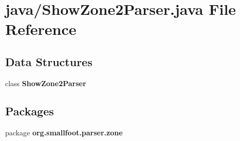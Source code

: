 \section{java/\+Show\+Zone2\+Parser.java File Reference}
\label{ShowZone2Parser_8java}
\subsection*{Data Structures}
\begin{DoxyCompactItemize}
\item 
class {\bf Show\+Zone2\+Parser}
\end{DoxyCompactItemize}
\subsection*{Packages}
\begin{DoxyCompactItemize}
\item 
package {\bf org.\+smallfoot.\+parser.\+zone}
\end{DoxyCompactItemize}
